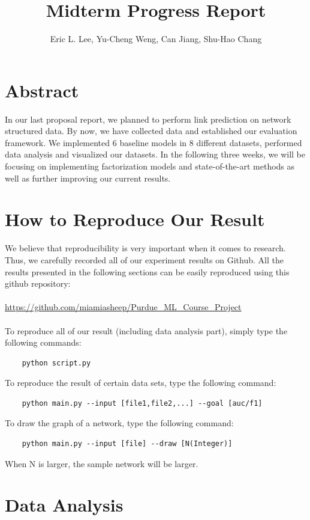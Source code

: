 \documentclass[12pt]{article}
\begin{document}
 
	\title{Midterm Progress Report}
	\author{Eric L. Lee, Yu-Cheng Weng, Can Jiang, Shu-Hao Chang} 
	\maketitle
	
	\section{Abstract}
	
	In our last proposal report, we planned to perform link prediction on network structured data.
	By now, we have collected data and established our evaluation framework. We implemented 6 baseline models in 8 different datasets, performed data analysis and visualized our datasets. In the following three weeks, we will be focusing on implementing factorization models and state-of-the-art methods as well as further improving our current results. 
	
	\section{How to Reproduce Our Result}
	We believe that reproducibility is very important when it comes to research. Thus, we carefully recorded all of our experiment results on Github. All the results presented in the following sections can be easily reproduced using this github repository: 
	\\
	\\
	\url{https://github.com/miamiasheep/Purdue\_ML\_Course\_Project}
	\\
	\\
	To reproduce all of our result (including data analysis part), simply type the following commands: 
	\begin{lstlisting}
	python script.py
	\end{lstlisting}
	To reproduce the result of certain data sets, type the following command:
	\begin{lstlisting}
	python main.py --input [file1,file2,...] --goal [auc/f1]
	\end{lstlisting}
	To draw the graph of a network, type the following command:
	\begin{lstlisting}
	python main.py --input [file] --draw [N(Integer)]
	\end{lstlisting}
	When N is larger, the sample network will be larger.
	
	\section{Data Analysis}
	
\end{document}

